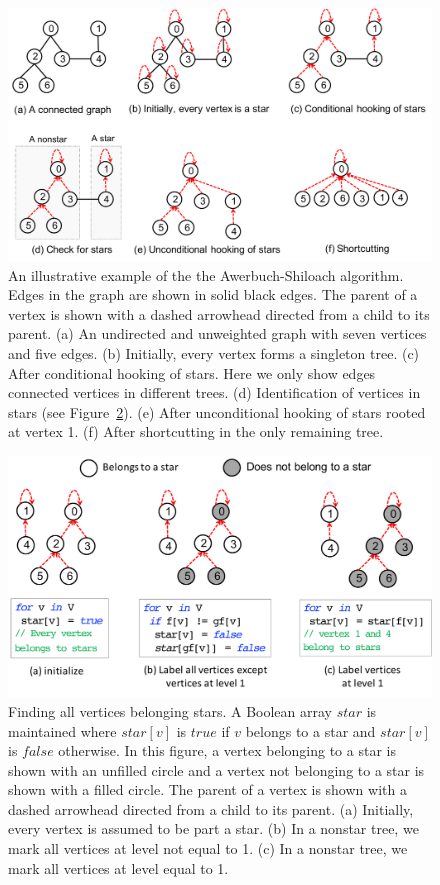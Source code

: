 \begin{figure}[!t]
   \centering
   \includegraphics[scale=.45]{figures/example} 
   \caption{An illustrative example of the the Awerbuch-Shiloach algorithm. Edges in the graph are shown in solid black edges. The parent of a vertex is shown with a dashed arrowhead directed from a child to its parent. (a) An undirected and unweighted graph with seven vertices and five edges. (b) Initially, every vertex forms a singleton tree. (c) After conditional hooking of stars. Here we only show edges connected vertices in different trees. (d) Identification of vertices in stars (see Figure~\ref{fig:starcheck}). (e) After unconditional hooking of stars rooted at vertex 1. (f) After shortcutting in the only remaining tree. }
   \label{fig:example}
\end{figure}



\begin{figure}[!t]
   \centering
   \includegraphics[scale=.45]{figures/starcheck} 
   \caption{Finding all vertices belonging stars. A Boolean array $star$ is maintained where $star[v]$ is $true$ if $v$ belongs to a star and $star[v]$ is $false$ otherwise. In this figure, a vertex belonging to a star is shown with an unfilled circle and a vertex  not belonging to a star is shown with a filled circle. The parent of a vertex is shown with a dashed arrowhead directed from a child to its parent. (a) Initially, every vertex is assumed to be part a star. (b) In a nonstar tree, we mark all vertices at level not equal to 1. (c) In a nonstar tree, we mark all vertices at level equal to 1.}
   \label{fig:starcheck}
\end{figure}


